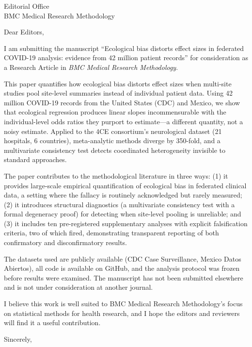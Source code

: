 \documentclass[11pt]{letter}
\date{July 7, 2026}
\begin{document}
\begin{letter}{Editorial Office\\BMC Medical Research Methodology}

\opening{Dear Editors,}

I am submitting the manuscript ``Ecological bias distorts effect sizes
in federated COVID-19 analysis: evidence from 42 million patient
records'' for consideration as a Research Article in \textit{BMC
Medical Research Methodology}.

This paper quantifies how ecological bias distorts effect sizes when
multi-site studies pool site-level summaries instead of individual
patient data.  Using 42 million COVID-19 records from the United
States (CDC) and Mexico, we show that ecological regression produces
linear slopes incommensurable with the individual-level odds ratios
they purport to estimate---a different quantity, not a noisy estimate.
Applied to the 4CE consortium's neurological dataset (21 hospitals, 6
countries), meta-analytic methods diverge by 350-fold, and a
multivariate consistency test detects coordinated heterogeneity
invisible to standard approaches.

The paper contributes to the methodological literature in three ways:
(1) it provides large-scale empirical quantification of ecological
bias in federated clinical data, a setting where the fallacy is
routinely acknowledged but rarely measured; (2) it introduces
structural diagnostics (a multivariate consistency test with a formal
degeneracy proof) for detecting when site-level pooling is
unreliable; and (3) it includes ten pre-registered supplementary
analyses with explicit falsification criteria, two of which fired,
demonstrating transparent reporting of both confirmatory and
disconfirmatory results.

The datasets used are publicly available (CDC Case Surveillance,
Mexico Datos Abiertos), all code is available on GitHub, and the
analysis protocol was frozen before results were examined.  The
manuscript has not been submitted elsewhere and is not under
consideration at another journal.

I believe this work is well suited to BMC Medical Research
Methodology's focus on statistical methods for health research, and I
hope the editors and reviewers will find it a useful contribution.

\closing{Sincerely,}

\end{letter}
\end{document}
